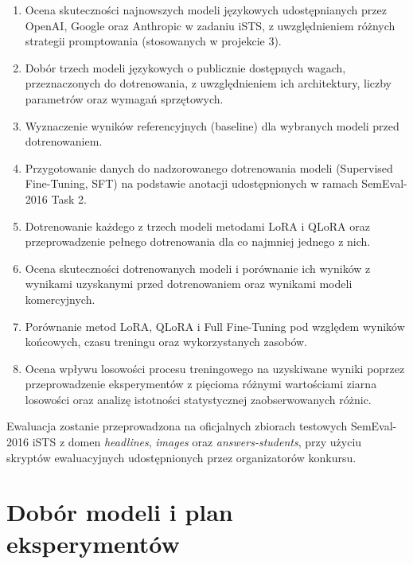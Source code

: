 \documentclass[a4paper,10pt]{article}
\begin{document}
\begin{enumerate}
    \item Ocena skuteczności najnowszych modeli językowych
    udostępnianych przez OpenAI, Google oraz Anthropic
    w zadaniu iSTS, z uwzględnieniem różnych strategii
    promptowania (stosowanych w projekcie 3).

    \item Dobór trzech modeli językowych o publicznie
    dostępnych wagach, przeznaczonych do dotrenowania,
    z uwzględnieniem ich architektury, liczby parametrów
    oraz wymagań sprzętowych.

    \item Wyznaczenie wyników referencyjnych (baseline)
    dla wybranych modeli przed dotrenowaniem.

    \item Przygotowanie danych do nadzorowanego
    dotrenowania modeli (Supervised Fine-Tuning, SFT)
    na podstawie anotacji udostępnionych w ramach
    SemEval-2016 Task 2.

    \item Dotrenowanie każdego z trzech modeli metodami
    LoRA i QLoRA oraz przeprowadzenie pełnego dotrenowania
 dla co najmniej jednego z nich.

    \item Ocena skuteczności dotrenowanych modeli
    i porównanie ich wyników z wynikami uzyskanymi
    przed dotrenowaniem oraz wynikami modeli
    komercyjnych.

    \item Porównanie metod LoRA, QLoRA i Full Fine-Tuning
    pod względem wyników końcowych, czasu treningu
    oraz wykorzystanych zasobów.

    \item Ocena wpływu losowości procesu treningowego
    na uzyskiwane wyniki poprzez przeprowadzenie
    eksperymentów z pięcioma różnymi wartościami
    ziarna losowości oraz analizę istotności
    statystycznej zaobserwowanych różnic.
\end{enumerate}

Ewaluacja zostanie przeprowadzona na oficjalnych zbiorach
testowych SemEval-2016 iSTS z domen \textit{headlines},
\textit{images} oraz \textit{answers-students}, przy
użyciu skryptów ewaluacyjnych udostępnionych przez
organizatorów konkursu.

\section{Dobór modeli i plan eksperymentów}
\end{document}
